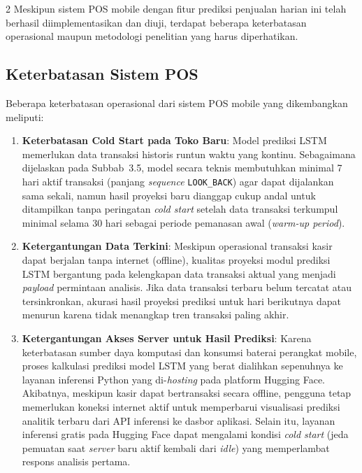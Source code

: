 \documentclass[12pt, a4paper, onecolumn, oneside]{report}
\begin{document}
\begin{spacing}{2}
Meskipun sistem POS mobile dengan fitur prediksi penjualan harian ini telah berhasil diimplementasikan dan diuji, terdapat beberapa keterbatasan operasional maupun metodologi penelitian yang harus diperhatikan.

\subsection{Keterbatasan Sistem POS}

Beberapa keterbatasan operasional dari sistem POS mobile yang dikembangkan meliputi:
\begin{enumerate}
    \item \textbf{Keterbatasan Cold Start pada Toko Baru}:
    Model prediksi LSTM memerlukan data transaksi historis runtun waktu yang kontinu. Sebagaimana dijelaskan pada Subbab~3.5, model secara teknis membutuhkan minimal 7 hari aktif transaksi (panjang \textit{sequence} \texttt{LOOK\_BACK}) agar dapat dijalankan sama sekali, namun hasil proyeksi baru dianggap cukup andal untuk ditampilkan tanpa peringatan \textit{cold start} setelah data transaksi terkumpul minimal selama 30 hari sebagai periode pemanasan awal (\textit{warm-up period}).
    
    \item \textbf{Ketergantungan Data Terkini}:
    Meskipun operasional transaksi kasir dapat berjalan tanpa internet (offline), kualitas proyeksi modul prediksi LSTM bergantung pada kelengkapan data transaksi aktual yang menjadi \textit{payload} permintaan analisis. Jika data transaksi terbaru belum tercatat atau tersinkronkan, akurasi hasil proyeksi prediksi untuk hari berikutnya dapat menurun karena tidak menangkap tren transaksi paling akhir.
    
    \item \textbf{Ketergantungan Akses Server untuk Hasil Prediksi}:
    Karena keterbatasan sumber daya komputasi dan konsumsi baterai perangkat mobile, proses kalkulasi prediksi model LSTM yang berat dialihkan sepenuhnya ke layanan inferensi Python yang di-\textit{hosting} pada platform Hugging Face. Akibatnya, meskipun kasir dapat bertransaksi secara offline, pengguna tetap memerlukan koneksi internet aktif untuk memperbarui visualisasi prediksi analitik terbaru dari API inferensi ke dasbor aplikasi. Selain itu, layanan inferensi gratis pada Hugging Face dapat mengalami kondisi \textit{cold start} (jeda pemuatan saat \textit{server} baru aktif kembali dari \textit{idle}) yang memperlambat respons analisis pertama.
\end{enumerate}


\end{spacing}
\end{document}
